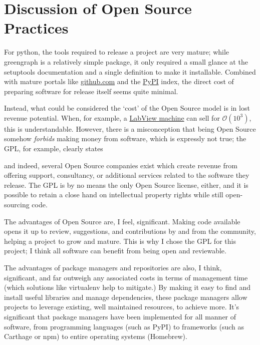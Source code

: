 \documentclass[12pt,a4paper]{article}
\begin{document}
\pagebreak

\section*{Discussion of Open Source Practices}
For python, the tools required to release a project are very mature; while greengraph is a relatively simple package, it only required a small glance at the setuptools documentation and a single definition to make it installable. Combined with mature portals like \url{github.com} and the \href{https://pypi.python.org/pypi}{PyPI} index, the direct cost of preparing software for release itself seems quite minimal. 

Instead, what could be considered the `cost' of the Open Source model is in lost revenue potential. When, for example, a \href{http://actimetrics.com/products/clocklab/}{LabView machine} can sell for \textsterling $\mathcal{O}(10^{3})$, this is understandable. However, there is a misconception that being Open Source somehow \textit{forbids} making money from software, which is expressly not true; the GPL, for example, clearly states

\textit{}

and indeed, several Open Source companies exist which create revenue from offering support, consultancy, or additional services related to the software they release. The GPL is by no means the only Open Source license, either, and it is possible to retain a close hand on intellectual property rights while still open-sourcing code. 

The advantages of Open Source are, I feel, significant. Making code available opens it up to review, suggestions, and contributions by and from the community, helping a project to grow and mature. This is why I chose the GPL for this project; I think all software can benefit from being open and reviewable.

The advantages of package managers and repositories are also, I think, significant, and far outweigh any associated costs in terms of management time (which solutions like virtualenv help to mitigate.) By making it easy to find and install useful libraries and manage dependencies, these package managers allow projects to leverage existing, well maintained resources, to achieve more. It's significant that package managers have been implemented for all manner of software, from programming languages (such as PyPI) to frameworks (such as Carthage or npm) to entire operating systems (Homebrew). 
\end{document}

